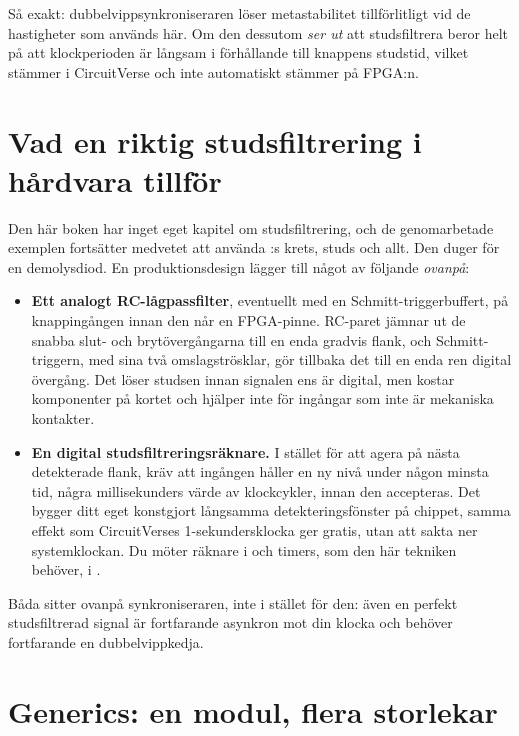 Så exakt: dubbelvippsynkroniseraren löser metastabilitet tillförlitligt vid de hastigheter som
används här. Om den dessutom \emph{ser ut} att studsfiltrera beror helt på att klockperioden är
långsam i förhållande till knappens studstid, vilket stämmer i CircuitVerse och inte automatiskt
stämmer på FPGA:n.

\section{Vad en riktig studsfiltrering i hårdvara tillför}
\label{c4:sec:debounce}

Den här boken har inget eget kapitel om studsfiltrering, och de genomarbetade exemplen fortsätter
medvetet att använda :s krets, studs och allt. Den duger för en
demolysdiod. En produktionsdesign lägger till något av följande \emph{ovanpå}:
\begin{itemize}
  \item \textbf{Ett analogt RC-lågpassfilter}, eventuellt med en Schmitt-triggerbuffert, på
    knappingången innan den når en FPGA-pinne. RC-paret jämnar ut de snabba slut- och
    brytövergångarna till en enda gradvis flank, och Schmitt-triggern, med sina två omslagströsklar,
    gör tillbaka det till en enda ren digital övergång. Det löser studsen innan signalen ens är
    digital, men kostar komponenter på kortet och hjälper inte för ingångar som inte är mekaniska
    kontakter.
  \item \textbf{En digital studsfiltreringsräknare.} I stället för att agera på nästa detekterade
    flank, kräv att ingången håller en ny nivå under någon minsta tid, några millisekunders värde
    av klockcykler, innan den accepteras. Det bygger ditt eget konstgjort långsamma
    detekteringsfönster på chippet, samma effekt som CircuitVerses 1-sekundersklocka ger gratis,
    utan att sakta ner systemklockan. Du möter räknare i  och timers, som den här
    tekniken behöver, i .
\end{itemize}

Båda sitter ovanpå synkroniseraren, inte i stället för den: även en perfekt studsfiltrerad signal
är fortfarande asynkron mot din klocka och behöver fortfarande en dubbelvippkedja.

\section{Generics: en modul, flera storlekar}
\label{c4:sec:generics}

